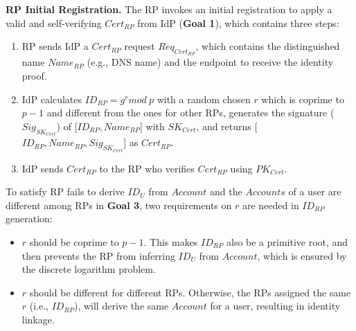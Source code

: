 \vspace{1mm}\noindent\textbf{RP Initial Registration.}
The RP invokes an initial registration to apply a valid and self-verifying $Cert_{RP}$ from IdP (\textbf{Goal 1}),
 which contains three steps:

\begin{enumerate}
\item RP sends IdP a $Cert_{RP}$ request $Req_{Cert_{RP}}$, which contains the distinguished name $Name_{RP}$ (e.g., DNS name) and the endpoint to receive the identity proof.
\item IdP calculates $ID_{RP} = g^r mod \ p$ with a random chosen $r$ which is coprime to $p-1$ and different from the ones for other RPs,  generates the signature ($Sig_{SK_{Cert}}$) of [$ID_{RP}, Name_{RP}$] with $SK_{Cert}$, and returns [$ID_{RP}, Name_{RP}, Sig_{SK_{Cert}}$] as $Cert_{RP}$.
\item IdP sends $Cert_{RP}$ to the RP who verifies $Cert_{RP}$ using $PK_{Cert}$.
\end{enumerate}


To satisfy RP fails to derive $ID_U$ from $Account$ and the $Accounts$ of a user are different among RPs in \textbf{Goal 3}, two requirements on $r$ are needed  in $ID_{RP}$ generation:
\begin{itemize}
  \item $r$ should be coprime to $p-1$. This makes $ID_{RP}$ also be  a primitive root, and then prevents the RP from inferring $ID_U$ from $Account$, which is  ensured by the discrete logarithm problem.

  \item  $r$ should be different for different RPs. Otherwise, the RPs assigned the same $r$ (i.e., $ID_{RP}$), will derive the same $Account$ for a user, resulting in identity linkage. %
\end{itemize}






